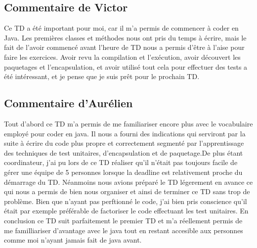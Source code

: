 \documentclass[a4paper,11pts]{article}
\begin{document}
\subsection{Commentaire de Victor}
Ce TD a été important pour moi, car il m'a permis de commencer à coder en Java. Les premières classes et méthodes nous ont pris du temps à écrire, mais le fait de l'avoir commencé avant l'heure de TD nous a permis d'être à l'aise pour faire les exercices. Avoir revu la compilation et l'exécution, avoir découvert les paquetages et l'encapsulation, et avoir utilisé tout cela pour effectuer des tests a été intéressant, et je pense que je suis prêt pour le prochain TD.

\subsection{Commentaire d'Aurélien}
Tout d'abord ce TD m'a permis de me familiariser encore plus avec le vocabulaire employé pour coder en java. Il nous a fourni des indications qui serviront par la suite à écrire du code plus propre et correctement segmenté par l'apprentissage des techniques de test unitaires, d'encapsulation et de paquetage.De plus étant coordinateur, j'ai pu lors de ce TD réaliser qu'il n'était pas toujours facile de gérer une équipe de 5 personnes lorsque la deadline est relativement proche du démarrage du TD. Néanmoins nous avions préparé le TD légerement en avance ce qui nous a permis de bien nous organiser et ainsi de terminer ce TD sans trop de problème. Bien que n'ayant pas perftionné le code, j'ai bien pris conscience qu'il était par exemple préférable de factoriser le code effectuant les test unitaires. En conclusion ce TD suit parfaitement le premier TD et m'a réellement permis de me familliariser d'avantage avec le java tout en restant accesible aux personnes comme moi n'ayant jamais fait de java avant.
\end{document}
